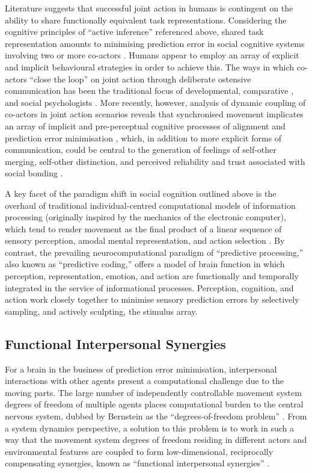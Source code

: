 Literature suggests that successful joint action in humans is contingent on the ability to share functionally equivalent task representations. Considering the cognitive principles of ``active inference'' referenced above, shared task representation amounts to minimising prediction error in social cognitive systems involving two or more co-actors \citep{Semin2008,Frith2010}.  Humans appear to employ an array of explicit and implicit behavioural strategies in order to achieve this.   The ways in which co-actors ``close the loop'' \citep{Frith2007} on joint action through deliberate ostensive communication has been the traditional focus of developmental, comparative \cite{Tomasello2005a}, and social psychologists \citep{Sebanz2006}.
More recently, however, analysis of dynamic coupling of co-actors in joint action scenarios reveals that synchronised movement implicates an array of implicit and pre-perceptual cognitive processes of alignment and prediction error minimisation \citep{Schmidt2011}, which, in addition to more explicit forms of communication, could be central to the generation of feelings of self-other merging, self-other distinction, and perceived reliability and trust associated with social bonding \citep{Marsh2009}.

A key facet of the paradigm shift in social cognition outlined above is the overhaul of traditional individual-centred computational models of information processing (originally inspired by the mechanics of the electronic computer), which tend to render movement as the final product of a linear sequence of sensory perception, amodal mental representation, and action selection \citep{Lewis2005}.  By contrast, the prevailing neurocomputational paradigm of ``predictive processing,'' also known as ``predictive coding,'' \citep[see][]{Frith2007,Kilner2009,Clark2013} offers a model of brain function in which perception, representation, emotion, and action are functionally and temporally integrated in the service of informational processes.  Perception, cognition, and action work closely together to minimise sensory prediction errors by selectively sampling, and actively sculpting, the stimulus array.

\subsection{Functional Interpersonal Synergies}
For a brain in the business of prediction error minimisation, interpersonal interactions with other agents present a computational challenge due to the moving parts.  The large number of independently controllable movement system degrees of freedom of multiple agents places computational burden to the central nervous system, dubbed by Bernstein \textcite{Bernstein1967} as the ``degrees-of-freedom problem'' \citep[see also][]{Turvey1982,Turvey1990}.  From a system dynamics perspective, a solution to this problem is to work in such a way that the movement system degrees of freedom residing in different actors and environmental features are coupled to form low-dimensional, reciprocally compensating synergies, known as ``functional interpersonal synergies'' \citep{Riley2011}.

